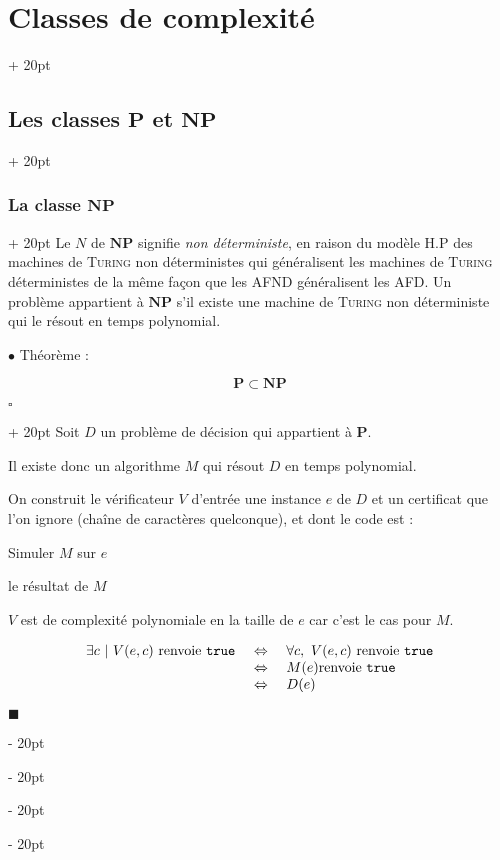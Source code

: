 \documentclass[a4paper, 12pt, twoside]{article}
\newenvironment{indalgo}[2][H]{
    \begin{algoBox}
        \begin{algorithm}[#1]
            \caption{#2}
}
{
        \end{algorithm}
    \end{algoBox}
}
\newcommand{\ssi}{\ \Leftrightarrow \ }
\newcommand{\ind}[1][20pt]{\advance\leftskip + #1}
\newcommand{\deind}[1][20pt]{\advance\leftskip - #1}
\newenvironment{indt}[2][20pt]{#2 \par \ind[#1]}{\par \deind} %
\newenvironment{proof}[1][{}]{\begin{indt}{$\square$ #1}}{$\blacksquare$ \end{indt}}
\begin{document}
\begin{indt}{\section{Classes de complexité}}
\begin{indt}{\subsection{Les classes $\mathbf P$ et $\mathbf{NP}$}}
\begin{indt}{\subsubsection{La classe $\mathbf{NP}$}}
                Le $N$ de $\mathbf{NP}$ signifie \emph{non déterministe}, en raison du modèle H.P des machines de \textsc{Turing} non déterministes qui généralisent les machines de \textsc{Turing} déterministes de la même façon que les AFND généralisent les AFD.
                Un problème appartient à $\mathbf{NP}$ s'il existe une machine de \textsc{Turing} non déterministe qui le résout en temps polynomial.

                \vspace{12pt}
                
                $\bullet$ Théorème :
                \begin{emphBox}
                    \[
                        \mathbf P \subset \mathbf{NP}
                    \]
                \end{emphBox}

                \vspace{6pt}
                
                \begin{proof}
                    Soit $D$ un problème de décision qui appartient à $\mathbf P$.

                    Il existe donc un algorithme $M$ qui résout $D$ en temps polynomial.

                    On construit le vérificateur $V$ d'entrée une instance $e$ de $D$ et un certificat que l'on ignore (chaîne de caractères quelconque), et dont le code est :

                    \begin{indalgo}{$V$}

                        \BlankLine

                        Simuler $M$ sur $e$\;

                        \Return le résultat de $M$\;
                    \end{indalgo}

                    $V$ est de complexité polynomiale en la taille de $e$ car c'est le cas pour $M$.

                    \[
                        \begin{array}{rcl}
                            \exists c\ |\ V(e, c)\ \text{renvoie \texttt{true}}
                            &\ssi&
                            \forall c,\ V(e, c)\ \text{renvoie \texttt{true}}
                            \\
                            &\ssi& M(e) \text{renvoie \texttt{true}}
                            \\
                            &\ssi& D(e)
                        \end{array}
                    \]


\end{proof}
\end{indt}
\end{indt}
\end{indt}
\end{document}
